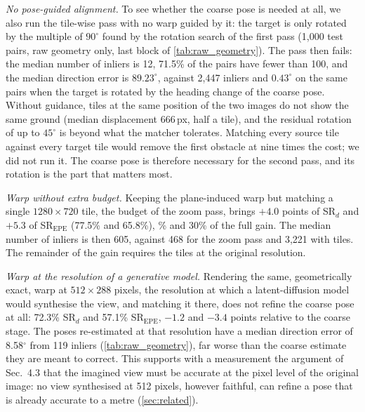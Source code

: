 \documentclass[10pt,twocolumn,letterpaper]{article}
\newcommand{\SRd}{SR$_{d}$}
\newcommand{\SRe}{SR$_{\mathrm{EPE}}$}
\begin{document}
\emph{No pose-guided alignment.} To see whether the coarse pose is needed at all, we also run the tile-wise pass with no warp guided by it: the target is only rotated by the multiple of $90^\circ$ found by the rotation search of the first pass (1{,}000 test pairs, raw geometry only, last block of \cref{tab:raw_geometry}). The pass then fails: the median number of inliers is 12, 71.5\% of the pairs have fewer than 100, and the median direction error is $89.23^\circ$, against 2{,}447 inliers and $0.43^\circ$ on the same pairs when the target is rotated by the heading change of the coarse pose. Without guidance, tiles at the same position of the two images do not show the same ground (median displacement 666\,px, half a tile), and the residual rotation of up to $45^\circ$ is beyond what the matcher tolerates. Matching every source tile against every target tile would remove the first obstacle at nine times the cost; we did not run it. The coarse pose is therefore necessary for the second pass, and its rotation is the part that matters most.

\emph{Warp without extra budget.} Keeping the plane-induced warp but matching a single $1280{\times}720$ tile, the budget of the zoom pass, brings \ensuremath{+4.0}{} points of \SRd{} and \ensuremath{+5.3}{} of \SRe{} (77.5\% and 65.8\%), \% and 30\% of the full gain. The median number of inliers is then 605, against 468 for the zoom pass and 3{,}221 with tiles. The remainder of the gain requires the tiles at the original resolution.

\emph{Warp at the resolution of a generative model.} Rendering the same, geometrically exact, warp at $512{\times}288$ pixels, the resolution at which a latent-diffusion model would synthesise the view, and matching it there, does not refine the coarse pose at all: 72.3\% \SRd{} and 57.1\% \SRe, \ie \ensuremath{-1.2}{} and \ensuremath{-3.4}{} points relative to the coarse stage. The poses re-estimated at that resolution have a median direction error of 8.58$^\circ$ from 119 inliers (\cref{tab:raw_geometry}), far worse than the coarse estimate they are meant to correct. This supports with a measurement the argument of Sec.~4.3 that the imagined view must be accurate at the pixel level of the original image: no view synthesised at 512 pixels, however faithful, can refine a pose that is already accurate to a metre (\cref{sec:related}).
\end{document}
